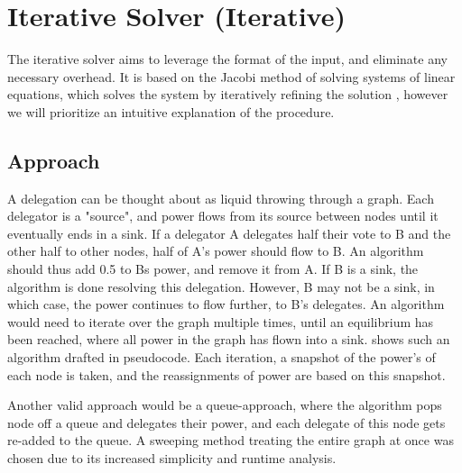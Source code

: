
\section{Iterative Solver (Iterative)}

The iterative solver aims to leverage the format of the input, and eliminate any necessary overhead. It is based on the Jacobi method of solving systems of linear equations, which solves the system by iteratively refining the solution , however we will prioritize an intuitive explanation of the procedure.

\subsection{Approach}

A delegation can be thought about as liquid throwing through a graph. Each delegator is a "source", and power flows from its source between nodes until it eventually ends in a sink. If a delegator A delegates half their vote to B and the other half to other nodes, half of A's power should flow to B. An algorithm should thus add 0.5 to Bs power, and remove it from A. If B is a sink, the algorithm is done resolving this delegation. However,  B may not be a sink, in which case, the power continues to flow further, to B's delegates. An algorithm would need to iterate over the graph multiple times, until an equilibrium has been reached, where all power in the graph has flown into a sink.  shows such an algorithm drafted in pseudocode. Each iteration, a snapshot of the power's of each node is taken, and the reassignments of power are based on this snapshot\footnotemark.  


Another valid approach would be a queue-approach, where the algorithm pops node off a queue and delegates their power, and each delegate of this node gets re-added to the queue. A sweeping method treating the entire graph at once was chosen due to its increased simplicity and runtime analysis.

